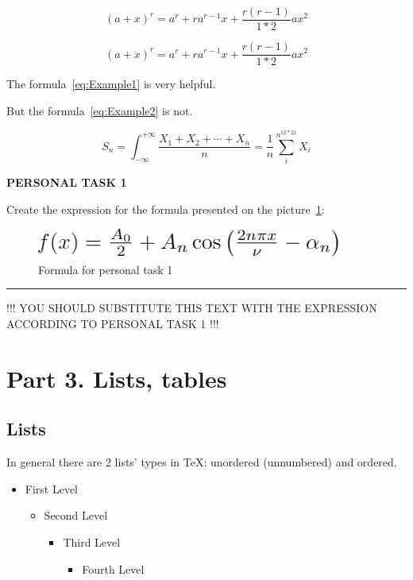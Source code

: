 \documentclass[a4paper]{article}
\begin{document}
\begin{equation}
(a+x)^r=a^r+ra^{r-1}x+\frac{r(r-1)}{1*2}ax^2    
\label{eq:Example1}    
\end{equation}

\begin{equation*}
(a+x)^r=a^r+ra^{r-1}x+\frac{r(r-1)}{1*2}ax^2    
\label{eq:Example2}    
\end{equation*}

\bigskip
The formula~\ref{eq:Example1} is very helpful.

But the formula~\ref{eq:Example2} is not.


\[S_n = \int_{-\infty}^{+\infty}\frac{X_1 + X_2 + \cdots + X_n}{n}
      = \frac{1}{n}\sum_{i}^{n^{12*21}} X_i\]

\vspace{2cm}

\textbf{PERSONAL TASK 1}
\bigskip
\rm

Create the expression for the formula presented on the picture~\ref{fig:Pers_Task_1}:

\begin{figure}
    \centering
    \includegraphics[scale=1.1]{Formula}
    \caption{Formula for personal task 1}
    \label{fig:Pers_Task_1}
\end{figure}


\hrule
\vspace{1cm}

!!! YOU SHOULD SUBSTITUTE THIS TEXT WITH THE EXPRESSION ACCORDING TO PERSONAL TASK 1 !!!

\newpage
\section{Part 3. Lists, tables}
\subsection{Lists}

In general there are 2 lists' types in \TeX: unordered (unnumbered) and ordered.

 \begin{itemize}
   \item  First Level
   \begin{itemize}
     \item  Second Level
     \begin{itemize}
       \item  Third Level
       \begin{itemize}
         \item  Fourth Level
       \end{itemize}
     \end{itemize}
   \end{itemize}
 \end{itemize}
 
\end{document}
